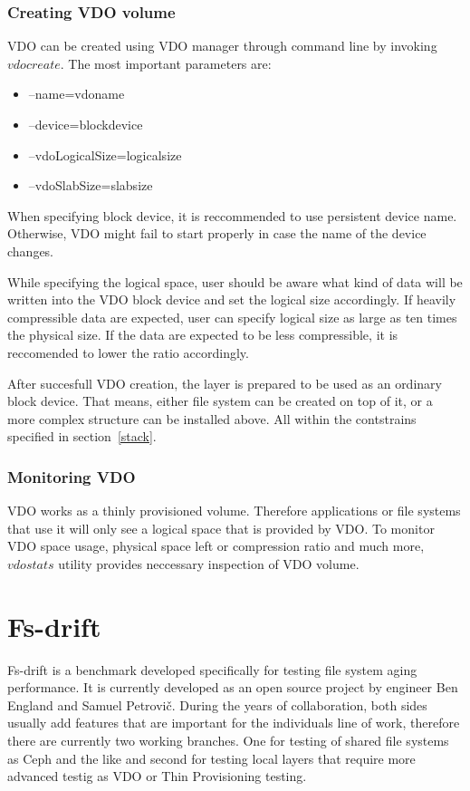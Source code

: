 \documentclass[
  color, %
  table, %
  lof,   %
  lot,   %
]{fithesis3}
\begin{document}
\subsection{Creating VDO volume}
VDO can be created using VDO manager through command line by invoking $vdo create$.
The most important parameters are:
\begin{itemize}
    \item --name=vdoname
    \item --device=blockdevice
    \item --vdoLogicalSize=logicalsize
    \item --vdoSlabSize=slabsize
\end{itemize}

When specifying block device, it is reccommended to use persistent device name. Otherwise, VDO might fail to start properly in case the name of the device changes.

While specifying the logical space, user should be aware what kind of data will be written into the VDO block device and set the logical size accordingly. If heavily compressible data are expected, user can specify logical size as large as ten times the physical size. If the data are expected to be less compressible, it is reccomended to lower the ratio accordingly.

After succesfull VDO creation, the layer is prepared to be used as an ordinary block device. That means, either file system can be created on top of it, or a more complex structure can be installed above. All within the contstrains specified in section~\ref{stack}.

\subsection{Monitoring VDO}
VDO works as a thinly provisioned volume. Therefore applications or file systems that use it will only see a logical space that is provided by VDO. To monitor VDO space usage, physical space left or compression ratio and much more, $vdostats$ utility provides neccessary inspection of VDO volume.

\chapter{Fs-drift}
Fs-drift is a benchmark developed specifically for testing file system aging performance. It is currently developed as an open source project by engineer Ben England and Samuel Petrovič. During the years of collaboration, both sides usually add features that are important for the individuals line of work, therefore there are currently two working branches. One for testing of shared file systems as Ceph and the like and second for testing local layers that require more advanced testig as VDO or Thin Provisioning testing. 
\end{document}
